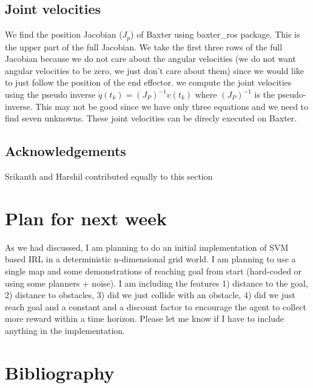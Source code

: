 \documentclass{article}[11pt]
\begin{document}
\subsection{Joint velocities} 
We find the position Jacobian ($J_p$) of Baxter using baxter\_ros package. This is the upper part of the full Jacobian. We take the first three rows of the full Jacobian because we do not care about the angular velocities (we do not want angular velocities to be zero, we just don't care about them) since we would like to just follow the position of the end effector. we compute the joint velocities using the pseudo inverse $\dot{q}(t_k) = (J_P)^{-1}v(t_k)$ where $(J_P)^{-1}$ is the pseudo-inverse. This may not be good since we have only three equations and we need to find seven unknowns. These joint velocities can be direcly executed on Baxter. 
\subsection{Acknowledgements}
Srikanth and Harshil contributed equally to this section



\section{Plan for next week}
As we had discussed, I am planning to do an initial implementation of SVM based IRL \cite{abbeel2004apprenticeship} in a deterministic n-dimensional grid world. I am planning to use a single map and some demonstrations of reaching goal from start (hard-coded or using some planners + noise). I am including the features 1) distance to the goal, 2) distance to obstacles, 3) did we just collide with an obstacle, 4) did we just reach goal and a constant and a discount factor to encourage the agent to collect more reward within a time horizon. Please let me know if I have to include anything in the implementation. 



\section{Bibliography}



\end{document}
